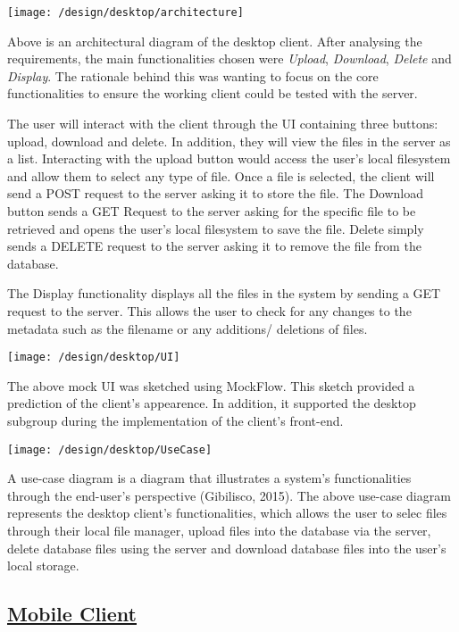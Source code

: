 \documentclass{article}
\begin{document}
\texttt{[image: /design/desktop/architecture]}

Above is an architectural diagram of the desktop client. After analysing the requirements, the main functionalities chosen were \textit{Upload}, \textit{Download}, \textit{Delete} and \textit{Display}. The rationale behind this was wanting to focus on the core functionalities to ensure the working client could be tested with the server.

The user will interact with the client through the UI containing three buttons: upload, download and delete. In addition, they will view the files in the server as a list. Interacting with the upload button would access the user’s local filesystem and allow them to select any type of file. Once a file is selected, the client will send a POST request to the server asking it to store the file. The Download button sends a GET Request to the server asking for the specific file to be retrieved and opens the user’s local filesystem to save the file. Delete simply sends a DELETE request to the server asking it to remove the file from the database.

The Display functionality displays all the files in the system by sending a GET request to the server. This allows the user to check for any changes to the metadata such as the filename or any additions/ deletions of files.

\texttt{[image: /design/desktop/UI]}

The above mock UI was sketched using MockFlow. This sketch provided a prediction of the client's appearence. In addition, it supported the desktop subgroup during the implementation of the client's front-end. 

\texttt{[image: /design/desktop/UseCase]}

A use-case diagram is a diagram that illustrates a system's functionalities through the end-user's perspective (Gibilisco, 2015). The above use-case diagram represents the desktop client's functionalities, which allows the user to selec files through their local file manager, upload files into the database via the server, delete database files using the server and download database files into the user's local storage.

\subsection{\underline{Mobile Client}}
\end{document}
